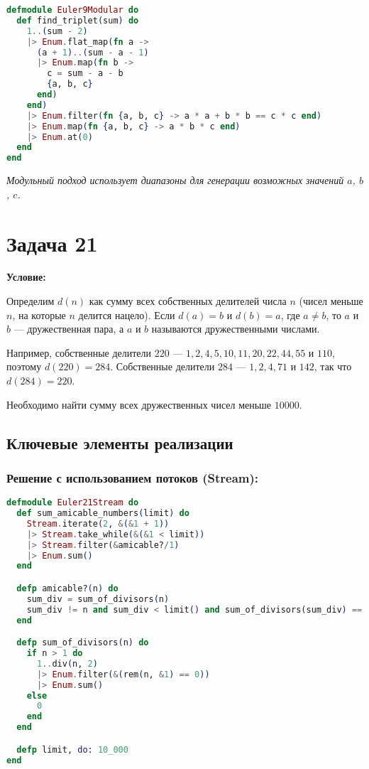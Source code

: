 \documentclass[a4paper]{article}
\begin{document}
\begin{lstlisting}[language=elixir, caption={Генерация чисел с использованием диапазонов},captionpos=b]
defmodule Euler9Modular do
  def find_triplet(sum) do
    1..(sum - 2)
    |> Enum.flat_map(fn a ->
      (a + 1)..(sum - a - 1)
      |> Enum.map(fn b ->
        c = sum - a - b
        {a, b, c}
      end)
    end)
    |> Enum.filter(fn {a, b, c} -> a * a + b * b == c * c end)
    |> Enum.map(fn {a, b, c} -> a * b * c end)
    |> Enum.at(0)
  end
end
\end{lstlisting}

\textit{Модульный подход использует диапазоны для генерации возможных значений $a$, $b$, $c$.}

\section*{Задача 21}

\textbf{Условие:}

Определим $d(n)$ как сумму всех собственных делителей числа $n$ (чисел меньше $n$, на которые $n$ делится нацело). Если $d(a) = b$ и $d(b) = a$, где $a \neq b$, то $a$ и $b$ — дружественная пара, а $a$ и $b$ называются дружественными числами.

Например, собственные делители $220$ — $1, 2, 4, 5, 10, 11, 20, 22, 44, 55$ и $110$, поэтому $d(220) = 284$. Собственные делители $284$ — $1, 2, 4, 71$ и $142$, так что $d(284) = 220$.

Необходимо найти сумму всех дружественных чисел меньше $10000$.

\subsection*{Ключевые элементы реализации}

\subsubsection*{Решение с использованием потоков (Stream):}

\begin{lstlisting}[language=elixir, caption={Использование потоков для нахождения дружественных чисел},captionpos=b]
defmodule Euler21Stream do
  def sum_amicable_numbers(limit) do
    Stream.iterate(2, &(&1 + 1))
    |> Stream.take_while(&(&1 < limit))
    |> Stream.filter(&amicable?/1)
    |> Enum.sum()
  end

  defp amicable?(n) do
    sum_div = sum_of_divisors(n)
    sum_div != n and sum_div < limit() and sum_of_divisors(sum_div) == n
  end

  defp sum_of_divisors(n) do
    if n > 1 do
      1..div(n, 2)
      |> Enum.filter(&(rem(n, &1) == 0))
      |> Enum.sum()
    else
      0
    end
  end

  defp limit, do: 10_000
end
\end{lstlisting}
\end{document}
